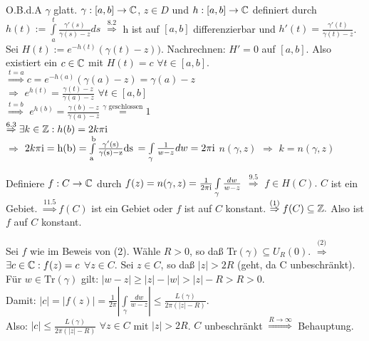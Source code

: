\documentclass[a4paper,twoside,DIV15,BCOR12mm]{scrbook}
\def\ie{\rm i}
\begin{document}
\begin{beweis}
\begin{liste}
\item O.B.d.A $\gamma$ glatt. $ \gamma : [a,b] \to \mathbb{C}$, $z \in D$ und $h:[a,b]
\to \mathbb{C}$ definiert durch $h(t) := \int\limits_{a}^{t}
\frac{\gamma'(s)}{\gamma(s)-z} ds$  
$\stackrel{\text{8.2}}{\Rightarrow}$ h ist auf $[a,b]$ differenzierbar und $h'(t) =
\frac{\gamma'(t)}{\gamma(t)-z}$.  \\ Sei $H(t) := e^{-h(t)}(\gamma(t)-z)).$
Nachrechnen: $H' = 0$ auf $[a,b]$. Also existiert ein $c \in \mathbb{C}$ mit $H(t) = c$
$\forall t \in [a,b]$. \\ $\stackrel{t = a}{\Rightarrow}c = 
e^{-h(a)}(\gamma(a)-z) = \gamma(a) -z$ \\
$\Rightarrow $ $e^{h(t)} = \frac{\gamma(t)-z}{\gamma(a)-z}$ $\forall t \in
[a,b]$ \\
$\stackrel{t = b}{\Rightarrow}$ $e^{h(b)} = \frac{\gamma(b)-z}{\gamma(a)-z}
\stackrel{\gamma \text{ geschlossen}}{=} 1$
\\ $\stackrel{\text{6.3}}{\Rightarrow} \exists k \in \MdZ: h(b) = 2k \pi \ie$ \\
$\Rightarrow$ $2k \pi \ie = h(b) = \int\limits_{a}^{b}
\frac{\gamma'(s)}{\gamma(s)-z} ds$ $= \int\limits_{\gamma}
\frac{1}{w-z} dw = 2 \pi \ie $ $n(\gamma,z)$ $\Rightarrow$ $ k = n(\gamma, z)$
\item Definiere $f: C \to \mathbb{C}$ durch $f(z) = n(\gamma, z) = \frac{1}{2 \pi \ie
} \int\limits_{\gamma}\frac{dw}{w-z}$ $\stackrel{9.5}{\Rightarrow}$ $f \in H(C).
$ $C$ ist ein Gebiet. $\stackrel{\text{11.5}}{\Rightarrow} f(C)$ ist ein Gebiet oder $f$
ist auf $C$ konstant. $\stackrel{\text{(1)}}{\Rightarrow} f(C) \subseteq \mathbb{Z}.$
Also ist $f$ auf $C$ konstant. 
\item Sei $f$ wie im Beweis von (2). Wähle $R > 0$, so daß Tr$(\gamma) \subseteq
U_R(0).$ $\stackrel{\text{(2)}}{\Rightarrow}$ $\exists c \in \mathbb{C}: f(z) = c$
$\forall z \in C$. Sei $z \in C$, so daß $|z| > 2R$ (geht, da C
unbeschränkt). \\
Für $w \in \text{Tr}(\gamma)$ gilt: $|w-z| \geq |z|-|w| > |z| -R > R > 0$. \\
Damit: $|c| = |f(z)| = \frac{1}{2 \pi} |\int\limits_{\gamma} \frac{dw}{w-z}|
\leq \frac{L(\gamma)}{2 \pi (|z| -R)}$. \\
Also: $|c| \leq \frac{L(\gamma)}{2 \pi (|z| -R)}$ $\forall z \in C$ mit $|z| >
2R$. $C$ unbeschränkt $\stackrel{R \to \infty}{\Rightarrow}$  Behauptung.
\end{liste}
\end{beweis}
\end{document}
